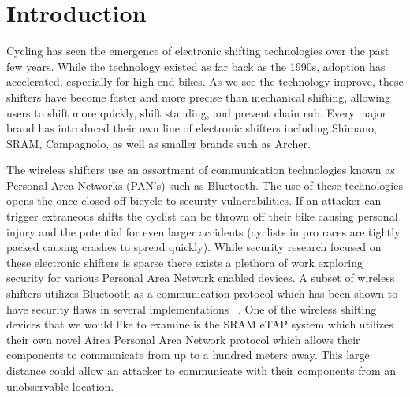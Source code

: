 \documentclass[letterpaper,twocolumn,10pt]{article}
\begin{document}

\section{Introduction}



Cycling has seen the emergence of electronic shifting technologies over the past few years. While the technology existed as far back as the 1990s, adoption has accelerated, especially for high-end bikes. As we see the technology improve, these shifters have become faster and more precise than mechanical shifting, allowing users to shift more quickly, shift standing, and prevent chain rub. Every major brand has introduced their own line of electronic shifters including Shimano, SRAM, Campagnolo, as well as smaller brands such as Archer.

The wireless shifters use an assortment of communication technologies known as Personal Area Networks (PAN’s) such as Bluetooth. The use of these technologies opens the once closed off bicycle to security vulnerabilities. If an attacker can trigger extraneous shifts the cyclist can be thrown off their bike causing personal injury and the potential for even larger accidents (cyclists in pro races are tightly packed causing crashes to spread quickly). While security research focused on these electronic shifters is sparse there exists a plethora of work exploring security for various Personal Area Network enabled devices. A subset of wireless shifters utilizes Bluetooth as a communication protocol which has been shown to have security flaws in several implementations~ \cite{JiWu}. One of the wireless shifting devices that we would like to examine is the SRAM eTAP system which utilizes their own novel Airea Personal Area Network protocol which allows their components to communicate from up to a hundred meters away. This large distance could allow an attacker to communicate with their components from an unobservable location.
\end{document}
